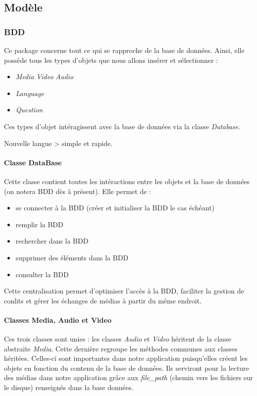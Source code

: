 \subsection{Modèle}


\subsubsection{BDD}

Ce package concerne tout ce qui se rapproche de la base de données. Ainsi, elle possède tous les types d'objets que nous allons insérer et sélectionner :
\begin{itemize}
 \item \textit{Media}
  \subitem \textit{Video}
  \subitem \textit{Audio}
 \item \textit{Language}
 \item \textit{Question}
\end{itemize}


Ces types d'objet intéragissent avec la base de données via la classe \textit{Database}.

Nouvelle langue > simple et rapide.

\paragraph{Classe DataBase}

Cette classe contient toutes les intéractions entre les objets et la base de données (on notera BDD dès à présent). Elle permet de :

\begin{itemize}
 \item se connecter à la BDD (créer et initialiser la BDD le cas échéant)
 \item remplir la BDD
 \item rechercher dans la BDD
 \item supprimer des éléments dans la BDD
 \item consulter la BDD
\end{itemize}


Cette centralisation permet d'optimiser l'accès à la BDD, faciliter la gestion de conlits et gérer les échanges de médias à partir du même endroit.

\paragraph{Classes Media, Audio et Video}

Ces trois classes sont unies : les classes \textit{Audio} et \textit{Video} héritent de la classe abstraite \textit{Media}. Cette dernière regroupe les méthodes communes aux classes héritées. Celles-ci sont importantes dans notre application puisqu'elles créent les objets en fonction du contenu de la base de données. Ils serviront pour la lecture des médias dans notre application grâce aux \textit{file\_path} (chemin vers les fichiers sur le disque) renseignés dans la base données.

